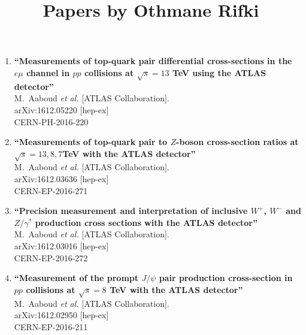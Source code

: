\documentclass{article}
\begin{document}
\title{Papers by Othmane Rifki}
\author{}
\date{}
\maketitle
\begin{enumerate}

\item%
{\bf ``Measurements of top-quark pair differential cross-sections in the $e\mu$ channel in $pp$ collisions at $\sqrt{s} = 13$ TeV using the ATLAS detector''}
  \\{}M.~Aaboud {\it et al.} [ATLAS Collaboration].
  \\{}arXiv:1612.05220 [hep-ex]
  \\{}CERN-PH-2016-220

\item%
{\bf ``Measurements of top-quark pair to $Z$-boson cross-section ratios at $\sqrt s = 13, 8, 7$TeV with the ATLAS detector''}
  \\{}M.~Aaboud {\it et al.} [ATLAS Collaboration].
  \\{}arXiv:1612.03636 [hep-ex]
  \\{}CERN-EP-2016-271

\item%
{\bf ``Precision measurement and interpretation of inclusive $W^+$, $W^-$ and $Z/\gamma^*$ production cross sections with the ATLAS detector''}
  \\{}M.~Aaboud {\it et al.} [ATLAS Collaboration].
  \\{}arXiv:1612.03016 [hep-ex]
  \\{}CERN-EP-2016-272
\item%
{\bf ``Measurement of the prompt $J/\psi$ pair production cross-section in $pp$ collisions at $\sqrt{s} = 8$ TeV with the ATLAS detector''}
  \\{}M.~Aaboud {\it et al.} [ATLAS Collaboration].
  \\{}arXiv:1612.02950 [hep-ex]
  \\{}CERN-EP-2016-211


\end{enumerate}
\end{document}
